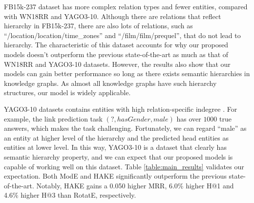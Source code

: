 \documentclass[letterpaper]{article} \usepackage{aaai20}  \usepackage{times}  \usepackage{helvet} \usepackage{courier}  \usepackage[hyphens]{url}  \usepackage{graphicx} \urlstyle{rm} \def\UrlFont{\rm}  \usepackage{graphicx}  \frenchspacing  \setlength{\pdfpagewidth}{8.5in}  \setlength{\pdfpageheight}{11in}
\newcommand{\citep}{\cite}
\begin{document}
FB15k-237 dataset has more complex relation types and fewer entities, compared with WN18RR and YAGO3-10. Although there are relations that reflect hierarchy in FB15k-237, there are also lots of relations, such as ``/location/location/time\_zones'' and ``/film/film/prequel'', that do not lead to hierarchy. The characteristic of this dataset accounts for why our proposed models doesn't outperform the previous state-of-the-art as much as that of WN18RR and YAGO3-10 datasets. However, the results also show that our models can gain better performance so long as there exists semantic hierarchies in knowledge graphs. As almost all knowledge graphs have such hierarchy structures, our model is widely applicable.  

YAGO3-10 datasets contains entities with high relation-specific indegree \citep{conve}. For example, the link prediction task $(?, hasGender, male)$ has over $1000$ true answers, which makes the task challenging. Fortunately, we can regard ``male'' as an entity at higher level of the hierarchy and the predicted head entities as entities at lower level. In this way, YAGO3-10 is a dataset that clearly has semantic hierarchy property, and we can expect that our proposed models is capable of working well on this dataset. Table \ref{table:main_results} validates our expectation. Both ModE and HAKE significantly outperform the previous state-of-the-art. Notably, HAKE gains a 0.050 higher MRR, 6.0\% higher H@1 and 4.6\% higher H@3 than RotatE, respectively.
\end{document}
